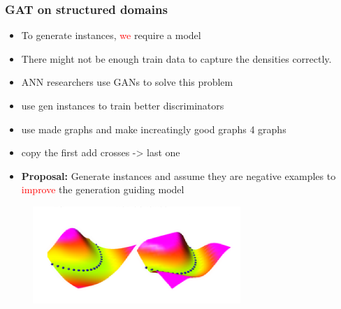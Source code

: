 \documentclass{beamer}
\newcommand{\red}[1]{\textcolor{red}{#1}}
\begin{document}
\begin{frame}
\frametitle{GAT on structured domains}
    \begin{itemize}

        \item To generate instances, \red{we} require a model 
        \item There might not be enough train data to capture the densities correctly. 
        \item ANN researchers use GANs to solve this problem
        \item use gen instances to train better discriminators
        \item use made graphs and make increatingly good graphs 4 graphs
        \item copy the first add crosses -> last one
        \item {\bf Proposal:} Generate instances and assume they are negative examples
            to \red{improve} the generation guiding model
    \end{itemize}
    \begin{figure}[ht]
        \centering
        \includegraphics[width=0.7\textwidth]{images/valley_clean.png}
    \end{figure}    
\end{frame}

\end{document}
